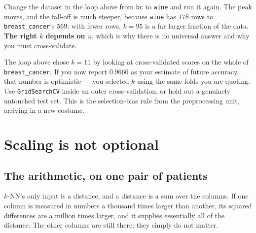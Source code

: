 \documentclass[11pt]{article}
\begin{document}
\begin{tryit}
Change the dataset in the loop above from \texttt{bc} to \texttt{wine} and run
it again. The peak moves, and the fall-off is much steeper, because
\texttt{wine} has $178$ rows to \texttt{breast\_cancer}'s $569$: with fewer
rows, $k=95$ is a far larger fraction of the data. \textbf{The right $k$
depends on $n$}, which is why there is no universal answer and why you must
cross-validate.
\end{tryit}

\begin{caution}
The loop above chose $k=11$ by looking at cross-validated scores on the whole
of \texttt{breast\_cancer}. If you now report $0.9666$ as your estimate of
future accuracy, that number is optimistic --- you selected $k$ using the same
folds you are quoting. Use \texttt{GridSearchCV} inside an outer
cross-validation, or hold out a genuinely untouched test set. This is the
selection-bias rule from the preprocessing unit, arriving in a new costume.
\end{caution}

\section{Scaling is not optional}
\label{sec:scale}

\subsection{The arithmetic, on one pair of patients}

$k$-NN's only input is a distance, and a distance is a sum over the columns.
If one column is measured in numbers a thousand times larger than another, its
squared differences are a million times larger, and it supplies essentially all
of the distance. The other columns are still there; they simply do not matter.
\end{document}
